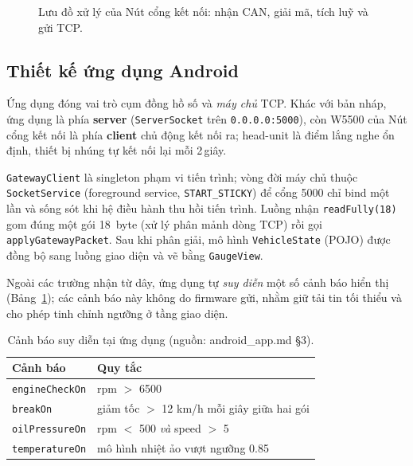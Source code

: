 \documentclass[../DoAn.tex]{subfiles}
\begin{document}
\begin{figure}[H]
  \centering
  \caption{Lưu đồ xử lý của Nút cổng kết nối: nhận CAN, giải mã, tích luỹ và gửi TCP.}
  \label{fig:gw-pipeline}
\end{figure}

\subsection{Thiết kế ứng dụng Android}
\label{section:4.2.3}

Ứng dụng đóng vai trò cụm đồng hồ số và \emph{máy chủ} TCP. Khác với bản nháp,
ứng dụng là phía \textbf{server} (\texttt{ServerSocket} trên
\texttt{0.0.0.0:5000}), còn W5500 của Nút cổng kết nối là phía \textbf{client}
chủ động kết nối ra; head-unit là điểm lắng nghe ổn định, thiết bị nhúng tự kết
nối lại mỗi 2\,giây.

\texttt{GatewayClient} là singleton phạm vi tiến trình; vòng đời máy chủ thuộc
\texttt{SocketService} (foreground service, \texttt{START\_STICKY}) để cổng 5000
chỉ bind một lần và sống sót khi hệ điều hành thu hồi tiến trình. Luồng nhận
\texttt{readFully(18)} gom đúng một gói 18~byte (xử lý phân mảnh dòng TCP) rồi
gọi \texttt{applyGatewayPacket}. Sau khi phân giải, mô hình \texttt{VehicleState}
(POJO) được đồng bộ sang luồng giao diện và vẽ bằng \texttt{GaugeView}.

Ngoài các trường nhận từ dây, ứng dụng tự \emph{suy diễn} một số cảnh báo hiển
thị (Bảng~\ref{tab:derived}); các cảnh báo này không do firmware gửi, nhằm giữ
tải tin tối thiểu và cho phép tinh chỉnh ngưỡng ở tầng giao diện.

\begin{table}[H]
  \centering
  \caption{Cảnh báo suy diễn tại ứng dụng (nguồn: android\_app.md §3).}
  \label{tab:derived}
  \begin{tabular}{@{}ll@{}}
    \toprule
    \textbf{Cảnh báo} & \textbf{Quy tắc} \\
    \midrule
    \texttt{engineCheckOn} & rpm $>$ 6500 \\
    \texttt{breakOn} & giảm tốc $>$ 12 km/h mỗi giây giữa hai gói \\
    \texttt{oilPressureOn} & rpm $<$ 500 \emph{và} speed $>$ 5 \\
    \texttt{temperatureOn} & mô hình nhiệt ảo vượt ngưỡng 0.85 \\
    \bottomrule
  \end{tabular}
\end{table}
\end{document}
